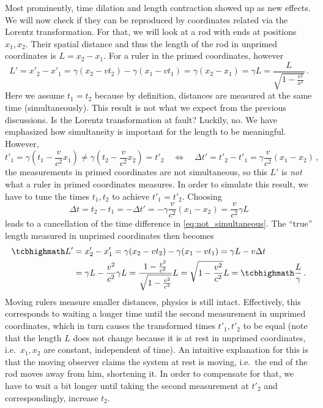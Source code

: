 Most prominently, time dilation and length contraction showed up as new effects. We will now check if they can be reproduced by coordinates related via the Lorentz transformation. For that, we will look at a rod with ends at positions $x_1, x_2$. Their spatial distance and thus the length of the rod in unprimed coordinates is $L = x_2 - x_1$. For a ruler in the primed coordinates, however
\begin{equation}
L' = x'_2 - x'_1 = \gamma (x_2 - v t_2) - \gamma (x_1 - v t_1) = \gamma (x_2 - x_1) = \gamma L = \frac{L}{\sqrt{1 - \frac{v^2}{x^2}}} \, .
\end{equation}
Here we assume $t_1 = t_2$ because by definition, distances are measured at the same time (simultaneously). This result is not what we expect from the previous discussions. Is the Lorentz transformation at fault? Luckily, no. We have emphasized how simultaneity is important for the length to be meaningful. However,
\begin{equation}\label{eq:not_simultaneous}
t'_1 = \gamma (t_1 - \frac{v}{c^2} x_1) \neq \gamma (t_2 - \frac{v}{c^2} x_2) = t'_2
\quad \Leftrightarrow \quad
\Delta t' = t'_2 - t'_1 = \gamma \frac{v}{c^2} (x_1 - x_2)
\, ,
\end{equation}
the measurements in primed coordinates are not simultaneous, so this $L'$ is \emph{not} what a ruler in primed coordinates measures. In order to simulate this result, we have to tune the times $t_1, t_2$ to achieve $t'_1 = t'_2$. Choosing
\begin{equation}
\Delta t = t_2 - t_1 = - \Delta t' = - \gamma \frac{v}{c^2} (x_1 - x_2) = \frac{v}{c^2} \gamma L
\end{equation}
leads to a cancellation of the time difference in \eqref{eq:not_simultaneous}. The \enquote{true} length measured in unprimed coordinates then becomes
\begin{equation}
\begin{split}
\eqbox{L'} &= x'_2 - x'_1 = \gamma (x_2 - v t_2) - \gamma (x_1 - v t_1) = \gamma L - v \Delta t
\\
&= \gamma L - \frac{v^2}{c^2} \gamma L = \frac{1 - \frac{v^2}{c^2}}{\sqrt{1 - \frac{v^2}{c^2}}} L = \sqrt{1 - \frac{v^2}{c^2}} L = \eqbox{\frac{L}{\gamma}} \, .
\end{split}
\end{equation}
Moving rulers measure smaller distances, physics is still intact.
Effectively, this corresponds to waiting a longer time until the second measurement in unprimed coordinates, which in turn causes the transformed times $t'_1, t'_2$ to be equal (note that the length $L$ does not change because it is at rest in unprimed coordinates, i.e.~$x_1, x_2$ are constant, independent of time). An intuitive explanation for this is that the moving observer claims the system at rest is moving, i.e.~the end of the rod moves away from him, shortening it. In order to compensate for that, we have to wait a bit longer until taking the second measurement at $t'_2$ and correspondingly, increase $t_2$.

